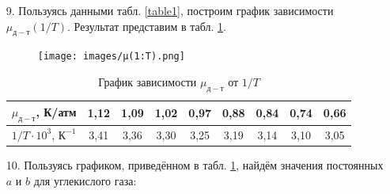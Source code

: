 \documentclass[a4paper, 12pt]{article}
\begin{document}
    \newpage
    
    \begin{enumerate}
    
        \item[9.] Пользуясь данными табл. \ref{table1}, построим график зависимости $\mu_{д-т}(1/T)$. Результат представим в табл. \ref{table2}.
        
        \begin{figure}[ht]
            \centering
            \texttt{[image: images/µ(1:T).png]}
        \end{figure}
        
        \begin{table}[ht]
            \centering
            \begin{tabular}{|c|c|c|c|c|c|c|c|c|}
                \hline
                $\mu_{д-т}$, К/атм & 1,12 & 1,09 & 1,02 & 0,97 & 0,88 & 0,84 & 0,74 & 0,66 \\
                \hline
                $1/T \cdot 10^3$, $К^{-1}$ & 3,41 & 3,36 & 3,30 & 3,25 & 3,19 & 3,14 & 3,10 & 3,05 \\
                \hline
            \end{tabular}
            \caption{График зависимости $\mu_{д-т}$ от $1/T$}
            \label{table2}
        \end{table}
        
        \item[10.] Пользуясь графиком, приведённом в табл. \ref{table2}, найдём значения постоянных $a$ и $b$ для углекислого газа:
        

\end{enumerate}
\end{document}
